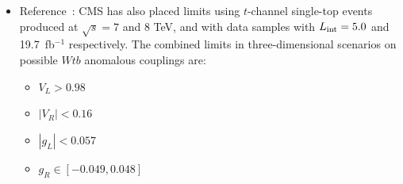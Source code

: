 \begin{itemize}
\item Reference~\cite{Khachatryan:2016sib}: CMS has also placed limits using $t$-channel single-top events produced at $\sqrt{s}=7$ and 8 TeV, and with data samples with $L_{\rm int}=5.0$ and 19.7~fb$^{-1}$ respectively. The combined limits in three-dimensional scenarios on possible $Wtb$ anomalous couplings are:
	\begin{itemize}
	\item $V_L > 0.98$
	\item $|V_R| < 0.16$
	\item $|g_L| < 0.057$
	\item $g_R \in [-0.049,0.048]$	
	\end{itemize}


\end{itemize}

 






    
